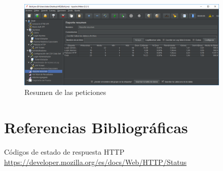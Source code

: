 \documentclass[12pt,a4paper]{article}
\begin{document}
	\begin{figure}[h]
		\centering
		\includegraphics[width=0.9\textwidth]{images/summary-report.png}
		\caption{Resumen de las peticiones}
	\end{figure}
	
	\newpage
	\section{Referencias Bibliográficas}
	\begin{thebibliography}{9}
		
		Códigos de estado de respuesta HTTP
		\url{https://developer.mozilla.org/es/docs/Web/HTTP/Status}
		
	\end{thebibliography}
		
\end{document}
